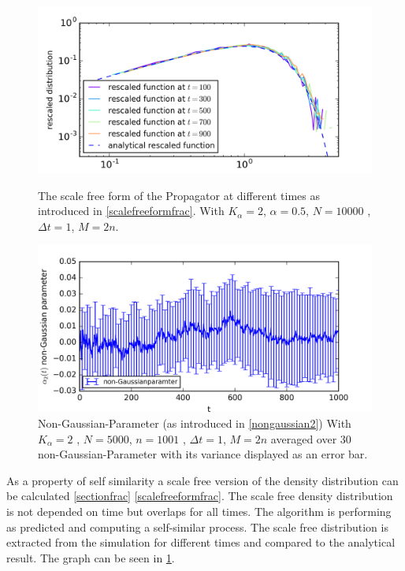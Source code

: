 \documentclass[
  a4paper,BCOR10mm,oneside,
  bibtotoc,idxtotoc,
  headsepline,footsepline,%
  fleqn,openbib
]{scrbook}
\begin{document}
\begin{figure}[h!]
\begin{minipage}{\textwidth}
\centering
\includegraphics[width=\textwidth]{./data/rescaled.png}
\caption{The scale free form of the Propagator at different times as introduced in \cref{scalefreeformfrac}. With $K_{\alpha}=2$, $\alpha=0.5 $, $N=10000$ , $\Delta t = 1$, $M=2n$.  }
\label{rescaledfigure}
\end{minipage}
\begin{minipage}{\textwidth}
\centering
\includegraphics[width=\textwidth]{./data/nongaussian.png}
\caption{Non-Gaussian-Parameter (as introduced in \cref{nongaussian2}) With $K_{\alpha}=2$ , $N=5000$, $n=1001$ , $\Delta t = 1$, $M=2n$ averaged over $30$ non-Gaussian-Parameter with its variance displayed as an error bar.}
 \centering
\end{minipage}
\end{figure}
\noindent As a property of self similarity a scale free version of the density distribution can be calculated \cref{sectionfrac} \cref{scalefreeformfrac}. The scale free density distribution is not depended on time but overlaps for all times. The algorithm is performing as predicted and computing a self-similar process. The scale free distribution is extracted from the simulation for different times and compared to the analytical result. The graph can be seen in \cref{rescaledfigure}.  
\end{document}

